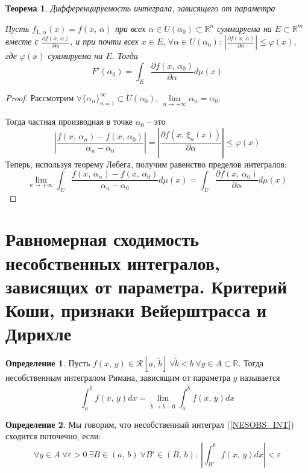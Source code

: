 \documentclass[a4paper,12pt]{article}
\renewcommand{\phi}{\ensuremath{\varphi}}
\renewcommand{\leq}{\ensuremath{\leqslant}}
\theoremstyle{plain}
\newtheorem{theorem}{Теорема}[section]
\theoremstyle{definition}
\newtheorem{definition}{Определение}[section]
\theoremstyle{remark}
\begin{document}
\begin{theorem}
	Дифференцируемость интеграла, зависящего от параметра

	Пусть $f_{1,\,\alpha}(x) = f(x,\,\alpha)$ при всех $\alpha \in U(\alpha_0) \subset \mathbb{R}^n$ суммируема на $E \subset \mathbb{R}^m$ вместе с $\frac{\partial f(x,\,\alpha)}{\partial \alpha}$, и при почти всех $x \in E,\, \forall \alpha \in U(\alpha_0)$: $\left|\frac{\partial f(x,\,\alpha)}{\partial \alpha}\right| \leq \phi(x)$, где $\phi(x)$ суммируема на $E$. Тогда
	\[F'(\alpha_0) = \int_E \frac{\partial f(x,\,\alpha_0)}{\partial \alpha}d\mu(x)\]
\end{theorem}

\begin{proof}
	Рассмотрим $\forall \{\alpha_n\}_{n = 1}^\infty \subset \dot{U}(\alpha_0),\, \lim\limits_{n \to +\infty}\alpha_n = \alpha_0$.

	Тогда частная производная в точке $\alpha_0$ -- это
	\[\left|\frac{f(x,\,\alpha_n) - f(x,\,\alpha_0)}{\alpha_n - \alpha_0}\right| = \left|\frac{\partial f(x,\,\xi_n(x))}{\partial \alpha}\right| \leq \phi(x)\]
	Теперь, используя теорему Лебега, получим равенство пределов интегралов:
	\[\lim_{n \to +\infty}\int_E \frac{f(x,\,\alpha_n) - f(x,\,\alpha_0)}{\alpha_n - \alpha_0}d\mu(x) = \int_E \frac{\partial f(x,\,\alpha_0)}{\partial	\alpha}d\mu(x)\]
\end{proof}

\section{Равномерная сходимость несобственных интегралов, зависящих от параметра. Критерий Коши, признаки Вейерштрасса и Дирихле}
\begin{definition}
	Пусть $f(x,\,y) \in \mathcal{R}[a,\,\tilde{b}] \: \forall \tilde{b} < b \: \forall y \in A \subset \mathbb{R}$. Тогда несобственным интегралом Римана, зависящим от параметра $y$ называется
	\begin{equation} \label{NESOBS_INT}
		\int_a^b f(x,\,y)dx = \lim_{\tilde{b} \to b - 0} \int_a^{\tilde{b}}f(x,\,y)dx
	\end{equation}
\end{definition}

\begin{definition}
	Мы говорим, что несобственный интеграл (\ref{NESOBS_INT}) сходится поточечно, если:
	\[\forall y \in A \: \forall \varepsilon > 0 \: \exists B \in (a,\,b) \: \forall B' \in (B,\,b):\: \left|\int_{B'}^b f(x,\,y)dx\right| < \varepsilon\]
\end{definition}
\end{document}
